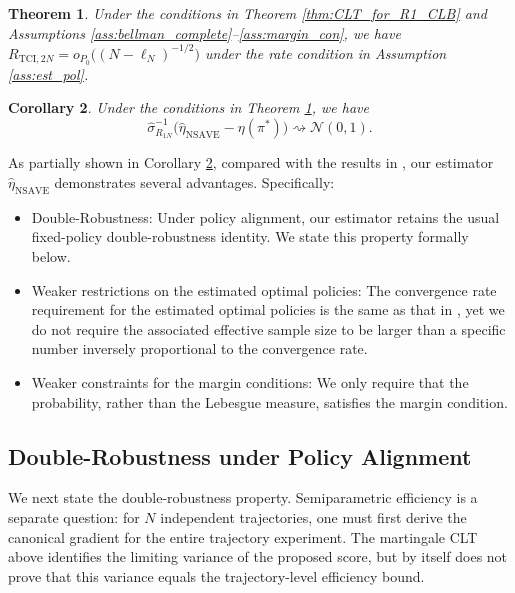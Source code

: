 \documentclass[12pt]{article}
\newtheorem{theorem}{Theorem}[section]
\newtheorem{corollary}[theorem]{Corollary}
\theoremstyle{remark}\newtheorem{remark}[theorem]{Remark}\theoremstyle{plain}
\begin{document}
\begin{theorem}\label{thm:o_P_for_R2_TCI}
    Under the conditions in Theorem \ref{thm:CLT_for_R1_CLB} and
    Assumptions \ref{ass:bellman_complete}--\ref{ass:margin_con}, we have
    $
        R_{\text{TCI}, 2N} = o_{P_0}\big( (N- \ell_N)^{-1 / 2} \big)
    $
    under the rate condition in Assumption \ref{ass:est_pol}.
\end{theorem}

\begin{corollary}\label{cor:CLT_for_NSAVE}
    Under the conditions in Theorem \ref{thm:o_P_for_R2_TCI}, we have 
    \[
        \widehat\sigma_{R_{1N}}^{-1}
        \big(\widehat{\eta}_{\text{NSAVE}}-\eta(\pi^*)\big)
        \rightsquigarrow\mathcal N(0,1).
    \]
\end{corollary}

As partially shown in Corollary \ref{cor:CLT_for_NSAVE}, compared with the results in \cite{shi2022statistical}, our estimator $\widehat{\eta}_{\text{NSAVE}}$ demonstrates several advantages. Specifically:
\begin{itemize}
    \item Double-Robustness: Under policy alignment, our estimator
    retains the usual fixed-policy double-robustness identity.  We
    state this property formally below.
    \item Weaker restrictions on the estimated optimal policies: The convergence rate requirement for the estimated optimal policies is the same as that in \cite{shi2022statistical}, yet we do not require the associated effective sample size to be larger than a specific number inversely proportional to the convergence rate.
    \item Weaker constraints for the margin conditions: We only require that the probability, rather than the Lebesgue measure, satisfies the margin condition.
\end{itemize}

\subsection{Double-Robustness under Policy Alignment}



We next state the double-robustness property.  Semiparametric
efficiency is a separate question: for $N$ independent trajectories,
one must first derive the canonical gradient for the entire trajectory
experiment.  The martingale CLT above identifies the limiting variance
of the proposed score, but by itself does not prove that this variance
equals the trajectory-level efficiency bound.
\end{document}
